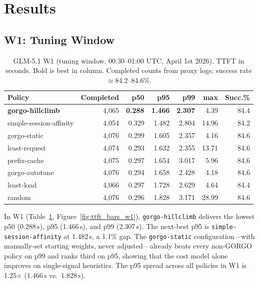 \documentclass{article}
\begin{document}
\section{Results}
\label{sec:results}

\subsection{W1: Tuning Window}

\begin{table}[t]
\centering
\small
\caption{GLM-5.1 W1 (tuning window, 00:30--01:00 UTC, April 1st 2026). TTFT in seconds. Bold
  is best in column. Completed counts from proxy logs; success rate
  $\approx$84.2--84.6\%.}
\label{tab:w1}
\begin{tabular}{lrrrrrr}
\toprule
Policy & Completed & p50 & p95 & p99 & max & Succ.\% \\
\midrule
\textbf{gorgo-hillclimb} & 4{,}065 & \textbf{0.288} & \textbf{1.466} & \textbf{2.307} & 4.39  & 84.4 \\
simple-session-affinity  & 4{,}054 & 0.329 & 1.482 & 2.804 & 14.96 & 84.2 \\
gorgo-static             & 4{,}076 & 0.299 & 1.605 & 2.357 & 4.16  & 84.6 \\
least-request            & 4{,}074 & 0.293 & 1.632 & 2.355 & 13.71 & 84.6 \\
prefix-cache             & 4{,}075 & 0.297 & 1.654 & 3.017 & 5.96  & 84.6 \\
gorgo-autotune           & 4{,}076 & 0.294 & 1.658 & 2.428 & 4.18  & 84.6 \\
least-load               & 4{,}066 & 0.297 & 1.728 & 2.629 & 4.64  & 84.4 \\
random                   & 4{,}076 & 0.296 & 1.828 & 3.171 & 28.99 & 84.6 \\
\bottomrule
\end{tabular}
\end{table}

In W1 (Table~\ref{tab:w1}, Figure~\ref{fig:ttft_bars_w1}), \texttt{gorgo-hillclimb} delivers the lowest p50
(0.288\,s), p95 (1.466\,s), and p99 (2.307\,s). The next-best p95 is
\texttt{simple-session-affinity} at 1.482\,s, a 1.1\% gap. The
\texttt{gorgo-static} configuration---with manually-set starting weights, never
adjusted---already beats every non-GORGO policy on p99 and ranks third on p95,
showing that the cost model alone improves on single-signal heuristics. The p95
spread across all policies in W1 is 1.25$\times$ (1.466\,s vs.\ 1.828\,s).
\end{document}
